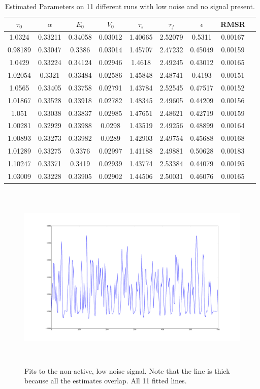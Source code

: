 \begin{table}[t]
\centering
\begin{tabular}{|c | c | c | c | c | c | c | c | c |}
\hline
$\tau_0$ & $\alpha$ & $E_0$    & $V_0$    & $\tau_s$ & $\tau_f$ & $\epsilon$  & \ac{RMSR} \\
\hline
1.0324 & 0.33211 & 0.34058 & 0.03012 & 1.40665 & 2.52079 & 0.5311 &   0.00167  \\
 0.98189 & 0.33047 & 0.3386 & 0.03014 & 1.45707 & 2.47232 & 0.45049 & 0.00159   \\
 1.0429 & 0.33224 & 0.34124 & 0.02946 & 1.4618 & 2.49245 & 0.43012 &  0.00165   \\
 1.02054 & 0.3321 & 0.33484 & 0.02586 & 1.45848 & 2.48741 & 0.4193 &  0.00151   \\
 1.0565 & 0.33405 & 0.33758 & 0.02791 & 1.43784 & 2.52545 & 0.47517 & 0.00152   \\
 1.01867 & 0.33528 & 0.33918 & 0.02782 & 1.48345 & 2.49605 & 0.44209 &0.00156   \\
 1.051 & 0.33038 & 0.33837 & 0.02985 & 1.47651 & 2.48621 & 0.42719 &  0.00159   \\
 1.00281 & 0.32929 & 0.33988 & 0.0298 & 1.43519 & 2.49256 & 0.48899 & 0.00164   \\
 1.00893 & 0.33273 & 0.33982 & 0.0289 & 1.42903 & 2.49754 & 0.45688 & 0.00168   \\
 1.01289 & 0.33275 & 0.3376 & 0.02997 & 1.41188 & 2.49881 & 0.50628 & 0.00183   \\
 1.10247 & 0.33371 & 0.3419 & 0.02939 & 1.43774 & 2.53384 & 0.44079 & 0.00195   \\
\hline
1.03009 & 0.33228 & 0.33905 & 0.02902 & 1.44506 & 2.50031 & 0.46076 & 0.00165 \\
\hline
\end{tabular}
\caption{Estimated Parameters on 11 different runs with low noise and no signal present.}
\label{tab:NoiseOnlyResults}
\end{table}

\begin{figure}[H]
\centering
\includegraphics[clip=true,trim=6cm 3cm 6cm 3cm,height=9cm]{images/fits_noiseonly}
\caption{Fits to the non-active, low noise signal. Note that the line is thick because all
the estimates overlap. All 11 fitted lines.}
\label{fig:fits_noiseonly}
\end{figure}

